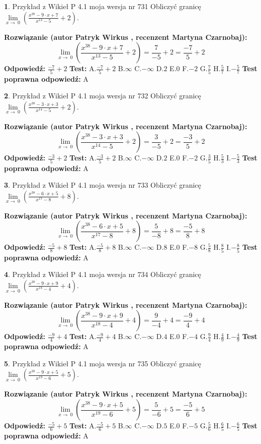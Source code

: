 \documentclass[12pt, a4paper]{article}
\theoremstyle{definition} %
\newtheorem{zad}{}
\newcommand{\zadStart}[1]{\begin{zad}#1\newline}
\newcommand{\zadStop}{\end{zad}}
\newcommand{\rozwStart}[2]{\noindent \textbf{Rozwiązanie (autor #1 , recenzent #2): }\newline}
\newcommand{\rozwStop}{\newline}
\newcommand{\odpStart}{\noindent \textbf{Odpowiedź:}\newline}
\newcommand{\odpStop}{\newline}
\newcommand{\testStart}{\noindent \textbf{Test:}\newline}
\newcommand{\testStop}{\newline}
\newcommand{\kluczStart}{\noindent \textbf{Test poprawna odpowiedź:}\newline}
\newcommand{\kluczStop}{\newline}
\begin{document}
\zadStart{Przykład z Wikieł P 4.1 moja wersja nr 731}
Obliczyć granicę $\lim\limits_{x\to\ 0}(\frac{x^{38}-9 \cdot x +7}{x^{13}-5}+2)$.
\zadStop
\rozwStart{Patryk Wirkus}{Martyna Czarnobaj}
$$\lim\limits_{x\to\ 0}(\frac{x^{38}-9 \cdot x +7}{x^{13}-5}+2)=\frac{7}{-5}+2=\frac{-7}{5}+2$$
\rozwStop
\odpStart
$\frac{-7}{5}+2$
\odpStop
\testStart
A.$\frac{-7}{5}+2$
B.$\infty$
C.$-\infty$
D.$2$
E.$0$
F.$-2$
G.$\frac{7}{5}$
H.$\frac{5}{7}$
I.$-\frac{5}{7}$
\testStop
\kluczStart
A
\kluczStop



\zadStart{Przykład z Wikieł P 4.1 moja wersja nr 732}
Obliczyć granicę $\lim\limits_{x\to\ 0}(\frac{x^{38}-3 \cdot x +3}{x^{14}-5}+2)$.
\zadStop
\rozwStart{Patryk Wirkus}{Martyna Czarnobaj}
$$\lim\limits_{x\to\ 0}(\frac{x^{38}-3 \cdot x +3}{x^{14}-5}+2)=\frac{3}{-5}+2=\frac{-3}{5}+2$$
\rozwStop
\odpStart
$\frac{-3}{5}+2$
\odpStop
\testStart
A.$\frac{-3}{5}+2$
B.$\infty$
C.$-\infty$
D.$2$
E.$0$
F.$-2$
G.$\frac{3}{5}$
H.$\frac{5}{3}$
I.$-\frac{5}{3}$
\testStop
\kluczStart
A
\kluczStop



\zadStart{Przykład z Wikieł P 4.1 moja wersja nr 733}
Obliczyć granicę $\lim\limits_{x\to\ 0}(\frac{x^{38}-6 \cdot x +5}{x^{17}-8}+8)$.
\zadStop
\rozwStart{Patryk Wirkus}{Martyna Czarnobaj}
$$\lim\limits_{x\to\ 0}(\frac{x^{38}-6 \cdot x +5}{x^{17}-8}+8)=\frac{5}{-8}+8=\frac{-5}{8}+8$$
\rozwStop
\odpStart
$\frac{-5}{8}+8$
\odpStop
\testStart
A.$\frac{-5}{8}+8$
B.$\infty$
C.$-\infty$
D.$8$
E.$0$
F.$-8$
G.$\frac{5}{8}$
H.$\frac{8}{5}$
I.$-\frac{8}{5}$
\testStop
\kluczStart
A
\kluczStop



\zadStart{Przykład z Wikieł P 4.1 moja wersja nr 734}
Obliczyć granicę $\lim\limits_{x\to\ 0}(\frac{x^{38}-9 \cdot x +9}{x^{18}-4}+4)$.
\zadStop
\rozwStart{Patryk Wirkus}{Martyna Czarnobaj}
$$\lim\limits_{x\to\ 0}(\frac{x^{38}-9 \cdot x +9}{x^{18}-4}+4)=\frac{9}{-4}+4=\frac{-9}{4}+4$$
\rozwStop
\odpStart
$\frac{-9}{4}+4$
\odpStop
\testStart
A.$\frac{-9}{4}+4$
B.$\infty$
C.$-\infty$
D.$4$
E.$0$
F.$-4$
G.$\frac{9}{4}$
H.$\frac{4}{9}$
I.$-\frac{4}{9}$
\testStop
\kluczStart
A
\kluczStop



\zadStart{Przykład z Wikieł P 4.1 moja wersja nr 735}
Obliczyć granicę $\lim\limits_{x\to\ 0}(\frac{x^{38}-9 \cdot x +5}{x^{19}-6}+5)$.
\zadStop
\rozwStart{Patryk Wirkus}{Martyna Czarnobaj}
$$\lim\limits_{x\to\ 0}(\frac{x^{38}-9 \cdot x +5}{x^{19}-6}+5)=\frac{5}{-6}+5=\frac{-5}{6}+5$$
\rozwStop
\odpStart
$\frac{-5}{6}+5$
\odpStop
\testStart
A.$\frac{-5}{6}+5$
B.$\infty$
C.$-\infty$
D.$5$
E.$0$
F.$-5$
G.$\frac{5}{6}$
H.$\frac{6}{5}$
I.$-\frac{6}{5}$
\testStop
\kluczStart
A
\kluczStop
\end{document}
